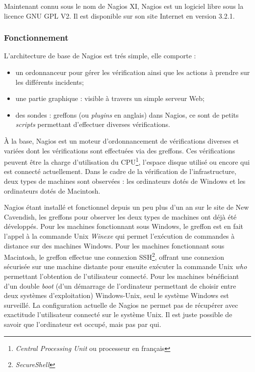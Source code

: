 Maintenant connu sous le nom de Nagios XI, Nagios est un logiciel libre sous la licence GNU GPL V2. 
Il est disponible sur son site Internet\cite{biblio:siteNagios} en version 3.2.1.

\subsubsection{Fonctionnement}

\noindent L'architecture de base de Nagios est tr\'es simple, elle comporte :

\begin{itemize}
	\item un ordonnanceur pour g\'erer les v\'erification ainsi que les actions \`a prendre sur les diff\'erents incidents;
	\item une partie graphique : visible \`a travers un simple serveur Web;
	\item des sondes : greffons (ou \textit{plugins} en anglais) dans Nagios, ce sont de petits \textit{scripts} permettant d'effectuer diverses v\'erifications.

\end{itemize}

\vspace{0.20cm}

\`A la base, Nagios est un moteur d'ordonnancement de v\'erifications diverses et vari\'ees dont les v\'erifications sont effectu\'ees via des greffons.
Ces v\'erifications peuvent \^etre la charge d'utilisation du CPU\protect\footnote{\textit{Central Processing Unit} ou processeur en fran\c{c}ais}, l'espace disque utilis\'e ou encore qui est connect\'e actuellement.
Dans le cadre de la v\'erification de l'infrastructure, deux types de machines sont observ\'ees : les ordinateurs dot\'es de Windows et les ordinateurs dot\'es de Macintosh.

Nagios \'etant install\'e et fonctionnel depuis un peu plus d'un an sur le site de New Cavendish, les greffons pour observer les deux types de machines ont d\'ej\`a \'et\'e d\'evelopp\'es.
Pour les machines fonctionnant sous Windows, le greffon est en fait l'appel \`a la commande Unix \textit{Winexe} qui permet l'ex\'ecution de commandes \`a distance sur des machines Windows.
Pour les machines fonctionnant sous Macintosh, le greffon effectue une connexion SSH\protect\footnote{\textit{SecureShell}}, offrant une connexion s\'ecuris\'ee sur une machine distante pour ensuite ex\'ecuter la commande Unix \textit{who} permettant l'obtention de l'utilisateur connect\'e.
Pour les machines b\'en\'eficiant d'un double \textit{boot} (d'un d\'emarrage de l'ordinateur permettant de choisir entre deux syst\`emes d'exploitation) Windows-Unix, seul le syst\`eme Windows est surveill\'e.
La configuration actuelle de Nagios ne permet pas de r\'ecup\'erer avec exactitude l'utilisateur connect\'e sur le syst\`eme Unix.
Il est juste possible de savoir que l'ordinateur est occup\'e, mais pas par qui.

